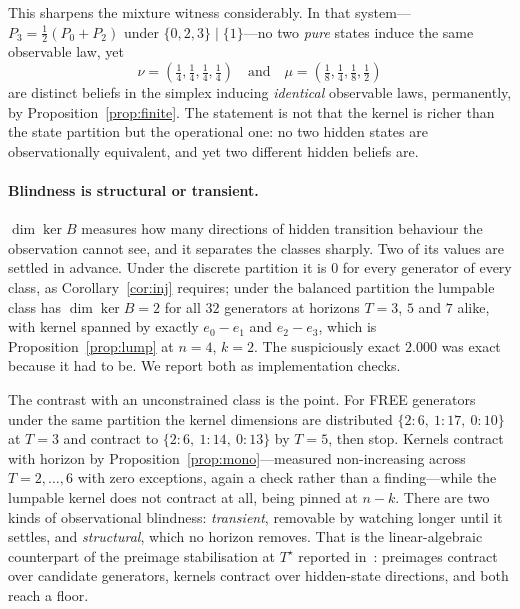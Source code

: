 \documentclass[11pt]{article}
\begin{document}
This sharpens the mixture witness considerably. In that system---$P_3 = \frac12(P_0+P_2)$
under $\{0,2,3\}\mid\{1\}$---no two \emph{pure} states induce the same observable law, yet
\[
  \nu = (\tfrac14,\tfrac14,\tfrac14,\tfrac14)
  \quad\text{and}\quad
  \mu = (\tfrac18,\tfrac14,\tfrac18,\tfrac12)
\]
are distinct beliefs in the simplex inducing \emph{identical} observable laws, permanently,
by Proposition~\ref{prop:finite}. The statement is not that the kernel is richer than the
state partition but the operational one: no two hidden states are observationally
equivalent, and yet two different hidden beliefs are.

\paragraph{Blindness is structural or transient.}
$\dim \ker B$ measures how many directions of hidden transition behaviour the observation
cannot see, and it separates the classes sharply. Two of its values are settled in advance. Under the discrete partition it is $0$ for every
generator of every class, as Corollary~\ref{cor:inj} requires; under the balanced partition
the lumpable class has $\dim \ker B = 2$ for all $32$ generators at horizons $T = 3$, $5$
and $7$ alike, with kernel spanned by exactly $e_0 - e_1$ and $e_2 - e_3$, which is
Proposition~\ref{prop:lump} at $n=4$, $k=2$. The suspiciously exact $2.000$ was exact
because it had to be. We report both as implementation checks.

The contrast with an unconstrained class is the point. For FREE generators under the same
partition the kernel dimensions are distributed $\{2\!:\!6,\ 1\!:\!17,\ 0\!:\!10\}$ at
$T=3$ and contract to $\{2\!:\!6,\ 1\!:\!14,\ 0\!:\!13\}$ by $T=5$, then stop. Kernels contract with horizon by
Proposition~\ref{prop:mono}---measured non-increasing across $T = 2, \dots, 6$ with zero
exceptions, again a check rather than a finding---while the lumpable kernel does not
contract at all, being pinned at $n-k$. There are two kinds of
observational blindness: \emph{transient}, removable by watching longer until it settles,
and \emph{structural}, which no horizon removes. That is the linear-algebraic counterpart
of the preimage stabilisation at $T^\star$ reported in~\cite[\S9]{paper1}: preimages
contract over candidate generators, kernels contract over hidden-state directions, and both
reach a floor.
\end{document}
